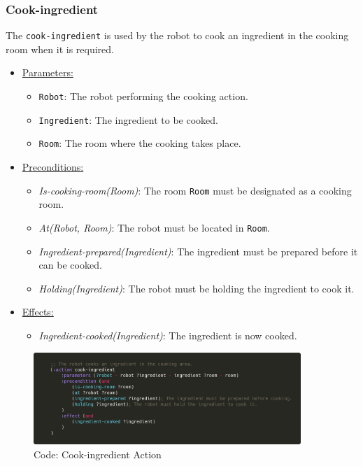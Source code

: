 \documentclass{article}
\begin{document}
\subsubsection{Cook-ingredient}
The \texttt{cook-ingredient} is used by the robot to cook an ingredient in the cooking room when it is required.
\begin{itemize}
    \item \underline{Parameters:}
    \begin{itemize}
        \item \texttt{Robot}: The robot performing the cooking action.
        \item \texttt{Ingredient}: The ingredient to be cooked.
        \item \texttt{Room}: The room where the cooking takes place.
    \end{itemize}
    \item \underline{Preconditions:}
    \begin{itemize}
        \item \textit{Is-cooking-room(Room)}: The room \texttt{Room} must be designated as a cooking room.
        \item \textit{At(Robot, Room)}: The robot must be located in \texttt{Room}.
        \item \textit{Ingredient-prepared(Ingredient)}: The ingredient must be prepared before it can be cooked.
        \item \textit{Holding(Ingredient)}: The robot must be holding the ingredient to cook it.
    \end{itemize}
    \item \underline{Effects:}
    \begin{itemize}
        \item \textit{Ingredient-cooked(Ingredient)}: The ingredient is now cooked.
    \end{itemize}
\end{itemize}
    \begin{figure}[ht]
    \centering
    \includegraphics[width=0.90\textwidth]{assets/cook-ingredient.png}
    \caption{Code: Cook-ingredient Action}
    \label{fig:act:cook-ing}
\end{figure}
\end{document}
